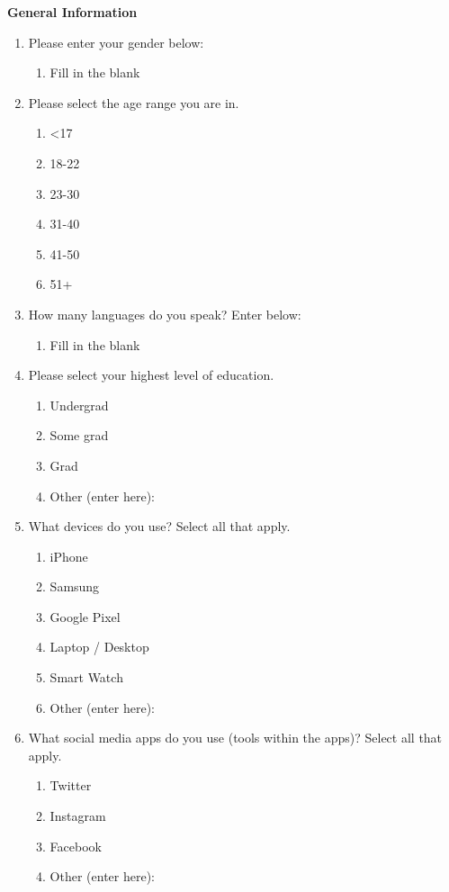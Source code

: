 \documentclass[acmsmall,screen,authorversion,nonacm]{acmart}
\begin{document}
\textbf{General Information}
\begin{enumerate}
    \item Please enter your gender below:
        \begin{enumerate}
            \item Fill in the blank
        \end{enumerate}
    \item Please select the age range you are in.
        \begin{enumerate}
            \item <17
            \item 18-22
            \item 23-30
            \item 31-40
            \item 41-50
            \item 51+
        \end{enumerate}
    \item How many languages do you speak? Enter below:
        \begin{enumerate}
            \item Fill in the blank
        \end{enumerate}
    \item Please select your highest level of education.
        \begin{enumerate}
            \item Undergrad
            \item Some grad
            \item Grad
            \item Other (enter here):
        \end{enumerate}
    \item What devices do you use? Select all that apply.
        \begin{enumerate}
            \item iPhone
            \item Samsung
            \item Google Pixel
            \item Laptop / Desktop
            \item Smart Watch
            \item Other (enter here):
        \end{enumerate}
        \item What social media apps do you use (tools within the apps)? Select all that apply.
            \begin{enumerate}
                \item Twitter
                \item Instagram
                \item Facebook
                \item Other (enter here):
            \end{enumerate}
\end{enumerate}
\end{document}
